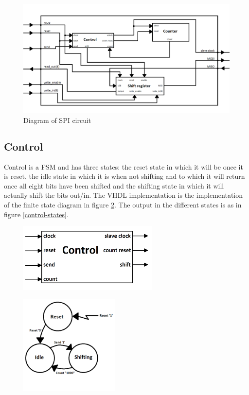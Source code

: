 \documentclass[11pt,twoside,a4paper]{article}
\begin{document}
\begin{figure}[htp!]
\center
\includegraphics[width=14cm]{./spi_diagram}
\caption{Diagram of SPI circuit}
\label{spi-structure}
\end{figure}

\subsection{Control}
Control is a FSM and has three states: the reset state in which it will be once it is reset, the idle state in which it is when not shifting and to which it will return once all eight bits have been shifted and the shifting state in which it will actually shift the bits out/in. The VHDL implementation is the implementation of the finite state diagram in figure \ref{control-fsm}.
The output in the different states is as in figure \ref{control-states}.

\begin{figure}
\centering
\begin{minipage}{.5\textwidth}
  \centering
  \includegraphics[width=7cm]{./control_diagram}
  \label{control-diagram}
\end{minipage}%
\begin{minipage}{.5\textwidth}
  \centering
  \includegraphics[width=5cm]{./control_fsm}
  \label{control-fsm}
\end{minipage}
\end{figure}
\end{document}
